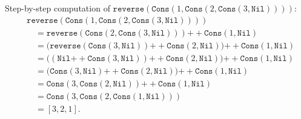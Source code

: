 \documentclass[11pt]{article}
\begin{document}
Step-by-step computation of
$\texttt{reverse}(\texttt{Cons}(1, \texttt{Cons}(2, \texttt{Cons}(3, \texttt{Nil}))))$:
\begin{align*}
  &\texttt{reverse}(\texttt{Cons}(1, \texttt{Cons}(2, \texttt{Cons}(3, \texttt{Nil})))) \\
  &\quad= \texttt{reverse}(\texttt{Cons}(2, \texttt{Cons}(3, \texttt{Nil})))
           \mathbin{+\!+} \texttt{Cons}(1, \texttt{Nil}) \\
  &\quad= \bigl(\texttt{reverse}(\texttt{Cons}(3, \texttt{Nil}))
           \mathbin{+\!+} \texttt{Cons}(2, \texttt{Nil})\bigr)
           \mathbin{+\!+} \texttt{Cons}(1, \texttt{Nil}) \\
  &\quad= \bigl((\texttt{Nil} \mathbin{+\!+} \texttt{Cons}(3, \texttt{Nil}))
           \mathbin{+\!+} \texttt{Cons}(2, \texttt{Nil})\bigr)
           \mathbin{+\!+} \texttt{Cons}(1, \texttt{Nil}) \\
  &\quad= \bigl(\texttt{Cons}(3, \texttt{Nil})
           \mathbin{+\!+} \texttt{Cons}(2, \texttt{Nil})\bigr)
           \mathbin{+\!+} \texttt{Cons}(1, \texttt{Nil}) \\
  &\quad= \texttt{Cons}(3, \texttt{Cons}(2, \texttt{Nil}))
           \mathbin{+\!+} \texttt{Cons}(1, \texttt{Nil}) \\
  &\quad= \texttt{Cons}(3, \texttt{Cons}(2, \texttt{Cons}(1, \texttt{Nil}))) \\
  &\quad= [3, 2, 1].
\end{align*}
\end{document}
